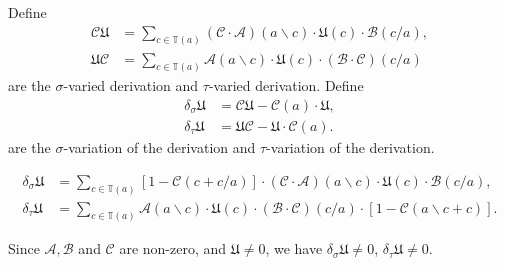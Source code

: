 \begin{definition}\label{def:varied-derivation-and-varities-of-derivation}
Define
\begin{align*}
    \mathcal{C}\mathfrak{U} &= \sum_{c \in \mathbb{T}(a)}(\mathcal{C}\cdot\mathcal{A})(a \backslash c)\cdot\mathfrak{U}(c)\cdot\mathcal{B}(c/a),\\
    \mathfrak{U}\mathcal{C} &= \sum_{c \in \mathbb{T}(a)}\mathcal{A}(a \backslash c)\cdot\mathfrak{U}(c)\cdot(\mathcal{B}\cdot\mathcal{C})(c/a)
\end{align*}
are the $\sigma$-varied derivation and $\tau$-varied derivation. Define
\begin{align*}
    \delta_{\sigma}\mathfrak{U} &= \mathcal{C}\mathfrak{U} - \mathcal{C}(a)\cdot\mathfrak{U},\\
    \delta_{\tau}\mathfrak{U} &= \mathfrak{U}\mathcal{C} - \mathfrak{U}\cdot \mathcal{C}(a).
\end{align*}
are the $\sigma$-variation of the derivation and $\tau$-variation of the derivation.
\end{definition}
\begin{proposition}
    \begin{align*}
    \delta_{\sigma}\mathfrak{U} &= \sum_{c \in \mathbb{T}(a)}\left[1 - \mathcal{C}(c + c/a)\right]\cdot(\mathcal{C}\cdot\mathcal{A})(a \backslash c)\cdot\mathfrak{U}(c)\cdot\mathcal{B}(c/a),\\
    \delta_{\tau}\mathfrak{U} &= \sum_{c \in \mathbb{T}(a)}\mathcal{A}(a \backslash c)\cdot\mathfrak{U}(c)\cdot(\mathcal{B}\cdot\mathcal{C})(c/a)\cdot\left[1 - \mathcal{C}(a \backslash c + c)\right].
\end{align*}
\end{proposition}
\begin{proposition}
    Since $\mathcal{A}, \mathcal{B}$ and $\mathcal{C}$ are non-zero, and $\mathfrak{U}\ne 0$, we have $\delta_{\sigma}\mathfrak{U} \ne 0$, $\delta_{\tau}\mathfrak{U} \ne 0$. 
\end{proposition}


